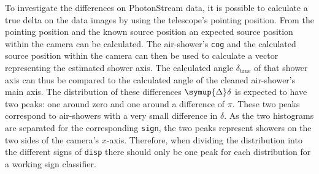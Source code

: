 To investigate the differences on PhotonStream data, it is possible to
calculate a true delta on the data images by using the telescope's pointing
position. From the pointing position and the known source position an
expected source position within the camera can be calculated. The
air-shower's \texttt{cog} and the calculated source position within the camera can
then be used to calculate a vector representing the estimated shower axis.
The calculated angle $\delta_\text{true}$ of that shower axis can thus be
compared to the calculated angle of the cleaned air-shower's main axis. The
distribution of these differences $\symup{\Delta}\delta$ is expected to have two peaks: one around
zero and one around a difference of $\pi$. These two peaks correspond to
air-showers with a very small difference in $\delta$. As the two histograms are
separated for the corresponding \texttt{sign}, the two peaks represent showers
on the two sides of the camera's $x$-axis. Therefore, when dividing the
distribution into the different signs of \texttt{disp} there should only be
one peak for each distribution for a working sign classifier.

